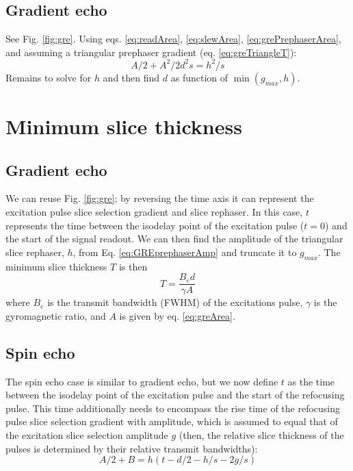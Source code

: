 \documentclass{article}
\begin{document}
\subsection{Gradient echo}
See Fig. \ref{fig:gre}. 
Using eqs. \ref{eq:readArea}, \ref{eq:slewArea}, \ref{eq:grePrephaserArea}, and assuming a triangular prephaser gradient (eq. \ref{eq:greTriangleT}):
\begin{equation}
    A/2 + A^2/{2d^2 s} = h^2/s
\end{equation}
Remains to solve for $h$ and then find $d$ as function of $\min(g_{max}, h)$.

\newpage

\section{Minimum slice thickness}

\subsection{Gradient echo}
We can reuse Fig. \ref{fig:gre}; by reversing the time axis it can represent the excitation pulse slice selection gradient and slice rephaser. 
In this case, $t$ represents the time between the isodelay point of the excitation pulse ($t=0$) and the start of the signal readout. 
We can then find the amplitude of the triangular slice rephaser, $h$, from Eq. \ref{eq:GREprephaserAmp} and truncate it to $g_{max}$.
The minimum slice thickness $T$ is then
\begin{equation}
    T = \frac{B_e d}{\gamma A}
    \label{eq:sliceThickness}
\end{equation}
where $B_e$ is the transmit bandwidth (FWHM) of the excitations pulse, $\gamma$ is the gyromagnetic ratio, and $A$ is given by eq. \ref{eq:greArea}.

\subsection{Spin echo}
The spin echo case is similar to gradient echo, but we now define $t$ as the time between the isodelay point of the excitation pulse and the start of the refocusing pulse. 
This time additionally needs to encompass the rise time of the refocusing pulse slice selection gradient with amplitude, which is assumed to equal that of the excitation slice selection amplitude $g$ (then, the relative slice thickness of the pulses is determined by their relative transmit bandwidths): 
\begin{equation}
    A/2 + B = h(t-d/2-h/s-2g/s)
    \label{eq:seSliceRephaserArea}
\end{equation}
\end{document}

